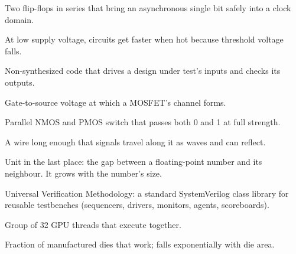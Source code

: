 \begin{description}[style=nextline,leftmargin=1.2em,itemsep=0.25em]
\item[Synchronizer] Two flip-flops in series that bring an asynchronous single bit safely into a clock domain.
\item[Temperature inversion] At low supply voltage, circuits get faster when hot because threshold voltage falls.
\item[Testbench] Non-synthesized code that drives a design under test's inputs and checks its outputs.
\item[Threshold voltage ($\Vt$)] Gate-to-source voltage at which a MOSFET's channel forms.
\item[Transmission gate] Parallel NMOS and PMOS switch that passes both 0 and 1 at full strength.
\item[Transmission line] A wire long enough that signals travel along it as waves and can reflect.
\item[ULP] Unit in the last place: the gap between a floating-point number and its neighbour. It grows with the number's size.
\item[UVM] Universal Verification Methodology: a standard SystemVerilog class library for reusable testbenches (sequencers, drivers, monitors, agents, scoreboards).
\item[Warp] Group of 32 GPU threads that execute together.
\item[Yield] Fraction of manufactured dies that work; falls exponentially with die area.
\end{description}
